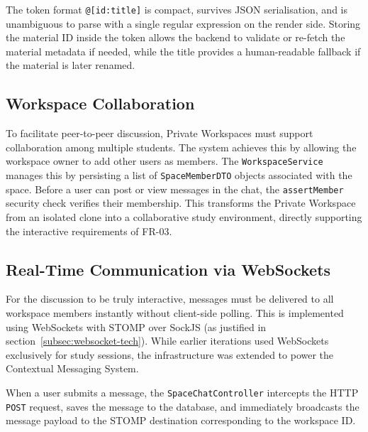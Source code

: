 The token format \texttt{@[id:title]} is compact, survives JSON serialisation, and is
unambiguous to parse with a single regular expression on the render side. Storing the material
ID inside the token allows the backend to validate or re-fetch the material metadata if needed,
while the title provides a human-readable fallback if the material is later renamed.

\subsection{Workspace Collaboration}
\label{subsec:impl-workspace-collaboration}

To facilitate peer-to-peer discussion, Private Workspaces must support collaboration among multiple students. The system achieves this by allowing the workspace owner to add other users as members. The \texttt{Workspace\allowbreak Service} manages this by persisting a list of \texttt{Space\allowbreak MemberDTO} objects associated with the space. Before a user can post or view messages in the chat, the \texttt{assert\allowbreak Member} security check verifies their membership. This transforms the Private Workspace from an isolated clone into a collaborative study environment, directly supporting the interactive requirements of FR-03.

\subsection{Real-Time Communication via WebSockets}
\label{subsec:impl-chat-sockets}

For the discussion to be truly interactive, messages must be delivered to all workspace members instantly without client-side polling. This is implemented using WebSockets with STOMP over SockJS (as justified in section~\ref{subsec:websocket-tech}). While earlier iterations used WebSockets exclusively for study sessions, the infrastructure was extended to power the Contextual Messaging System.

When a user submits a message, the \texttt{SpaceChatController} intercepts the HTTP \texttt{POST} request, saves the message to the database, and immediately broadcasts the message payload to the STOMP destination corresponding to the workspace ID.


